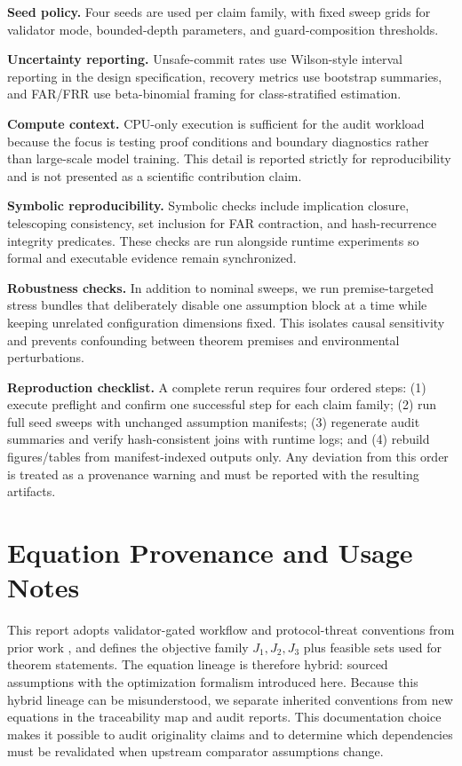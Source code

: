 \documentclass{article} %
\begin{document}
\textbf{Seed policy.} Four seeds are used per claim family, with fixed sweep grids for validator mode, bounded-depth parameters, and guard-composition thresholds.

\textbf{Uncertainty reporting.} Unsafe-commit rates use Wilson-style interval reporting in the design specification, recovery metrics use bootstrap summaries, and FAR/FRR use beta-binomial framing for class-stratified estimation.

\textbf{Compute context.} CPU-only execution is sufficient for the audit workload because the focus is testing proof conditions and boundary diagnostics rather than large-scale model training. This detail is reported strictly for reproducibility and is not presented as a scientific contribution claim.

\textbf{Symbolic reproducibility.} Symbolic checks include implication closure, telescoping consistency, set inclusion for FAR contraction, and hash-recurrence integrity predicates. These checks are run alongside runtime experiments so formal and executable evidence remain synchronized.

\textbf{Robustness checks.} In addition to nominal sweeps, we run premise-targeted stress bundles that deliberately disable one assumption block at a time while keeping unrelated configuration dimensions fixed. This isolates causal sensitivity and prevents confounding between theorem premises and environmental perturbations.

\textbf{Reproduction checklist.} A complete rerun requires four ordered steps: (1) execute preflight and confirm one successful step for each claim family; (2) run full seed sweeps with unchanged assumption manifests; (3) regenerate audit summaries and verify hash-consistent joins with runtime logs; and (4) rebuild figures/tables from manifest-indexed outputs only. Any deviation from this order is treated as a provenance warning and must be reported with the resulting artifacts.

\section{Equation Provenance and Usage Notes}
\label{app:eq_provenance}
This report adopts validator-gated workflow and protocol-threat conventions from prior work \citep{sawant2026,chang2025,ferrag2026,glas2026,dinu2024}, and defines the objective family $J_1,J_2,J_3$ plus feasible sets used for theorem statements. The equation lineage is therefore hybrid: sourced assumptions with the optimization formalism introduced here.
Because this hybrid lineage can be misunderstood, we separate inherited conventions from new equations in the traceability map and audit reports. This documentation choice makes it possible to audit originality claims and to determine which dependencies must be revalidated when upstream comparator assumptions change.
\end{document}
